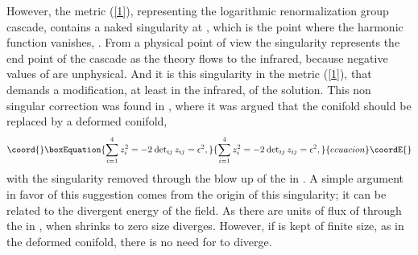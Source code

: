\documentclass[12pt,epsf,a4paper]{article}
\begin{document}
However, the metric (\ref{1}), representing the logarithmic renormalization group cascade, contains 
a naked singularity at \coordHE{}, which is the point where the harmonic function vanishes, \coordHE{}. 
From a physical point of view the singularity represents the end point of the cascade as 
the theory flows to the infrared, because negative values of \coordHE{} are unphysical. And it is this 
singularity in the metric (\ref{1}), that  demands a 
modification, at least in the 
infrared, of the solution. This non singular correction was found in \cite{KS}, where 
it was argued that the conifold should be replaced by a deformed conifold, 
\begin{equation}\coord{}\boxEquation{
\sum_{i=1}^4 z_i^2 = - 2 \: \hbox{det}_{ij} \, z_{ij} = \epsilon^2,
\label{7}
}{
\sum_{i=1}^4 z_i^2 = - 2 \: \hbox{det}_{ij} \, z_{ij} = \epsilon^2,
}{ecuacion}\coordE{}\end{equation}
with the singularity removed through the blow up of the \coordHE{} in \coordHE{}. A simple argument 
in favor of this suggestion comes from the origin of this singularity; it 
can be related to the divergent energy of the \coordHE{} field. As there are \coordHE{} units of 
flux of \coordHE{} through the \coordHE{} in \coordHE{}, when \coordHE{} shrinks to zero size \coordHE{} 
diverges. However, if \coordHE{} is kept of finite size, as in the deformed conifold, there is 
no need for \coordHE{} to diverge.
  
\end{document}
